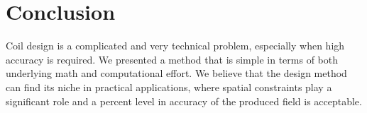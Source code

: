 %
%
%
%


\section{Conclusion}
Coil design is a complicated and very technical problem, especially when high accuracy is required. We presented a method that is simple in terms of both underlying math and computational effort. We believe that the design method can find its niche in practical applications, where spatial constraints play a significant role and a percent level in accuracy of the produced field is acceptable.


